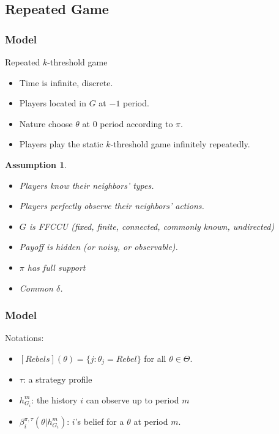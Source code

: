 \documentclass[10pt]{beamer}
\newtheorem{assumption}{Assumption}[section]
\begin{document}
\subsection{Repeated Game}
\begin{frame}
  \frametitle{Model}
Repeated $k$-threshold game
  \begin{itemize}

  \item  Time is infinite, discrete.
  \item Players located in $G$ at $-1$ period.
  \item Nature choose $\theta$ at $0$ period according to $\pi$.
  \item Players play the static $k$-threshold game infinitely repeatedly.


  \end{itemize}

\begin{assumption}
\begin{itemize}
\item Players know their neighbors' types.
\item Players perfectly observe their neighbors' actions. 
\item $G$ is FFCCU (fixed, finite, connected, commonly known, undirected)
  \item Payoff is hidden (or noisy, or observable).
  \item $\pi$ has full support

\item Common $\delta$. 
\end{itemize}

\end{assumption}

\end{frame}

\begin{frame}
  \frametitle{Model}

Notations:
\begin{itemize}
\item $[Rebels](\theta)=\{j:\theta_j=Rebel\}$ for all $\theta\in \Theta$.
 \item $\tau$: a strategy profile
 \item $h^{m}_{G_i}$: the history $i$ can observe up to period $m$
   \item $\beta^{\pi,\tau}_i(\theta|h^{m}_{G_i})$: $i$'s belief for a $\theta$ at period $m$. 
\end{itemize}

\end{frame}
\end{document}
